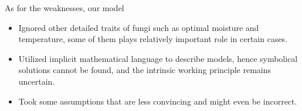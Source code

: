 As for the weaknesses, our model

\begin{itemize}
    \item Ignored other detailed traits of fungi such as optimal moisture and temperature, some of them plays relatively important role in certain cases.
    \item Utilized implicit mathematical language to describe models, hence symbolical solutions cannot be found, and the intrinsic working principle remains uncertain.
    \item Took some assumptions that are less convincing and might even be incorrect.
\end{itemize}
